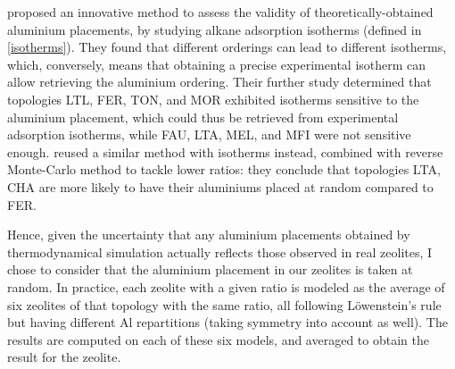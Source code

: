 \documentclass[main.tex]{subfiles}
\begin{document}
\Textcite{AlDistributionAlcanes} proposed an innovative method to assess the validity of theoretically-obtained aluminium placements, by studying alkane adsorption isotherms (defined in \cref{isotherms}). They found that different \SiAl orderings can lead to different isotherms, which, conversely, means that obtaining a precise experimental isotherm can allow retrieving the aluminium ordering. Their further study \cite{AlDistributionAlcanes2} determined that topologies LTL, FER, TON, and MOR exhibited isotherms sensitive to the aluminium placement, which could thus be retrieved from experimental adsorption isotherms, while FAU, LTA, MEL, and MFI were not sensitive enough. \Textcite{AlDistributionCO2Adsorption} reused a similar method with  isotherms instead, combined with reverse Monte-Carlo method to tackle lower \SiAl ratios: they conclude that topologies LTA, CHA are more likely to have their aluminiums placed at random compared to FER.

Hence, given the uncertainty that any aluminium placements obtained by thermodynamical simulation actually reflects those observed in real zeolites, I chose to consider that the aluminium placement in our zeolites is taken at random. In practice, each zeolite with a given \SiAl ratio is modeled as the average of six zeolites of that topology with the same \SiAl ratio, all following L\"owenstein's rule but having different Al repartitions (taking symmetry into account as well). The results are computed on each of these six models, and averaged to obtain the result for the zeolite.
\end{document}
